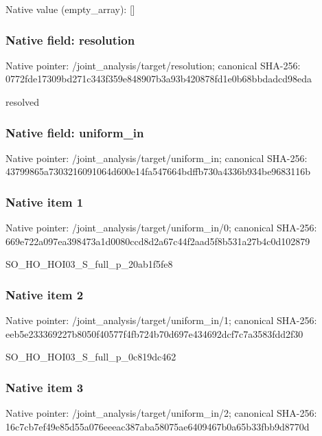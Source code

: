 \documentclass[10pt,a4paper]{article}
\begin{document}
Native value (empty\_\allowbreak{}array): []

\subsubsection{Native field: resolution}
Native pointer: /joint\_\allowbreak{}analysis/target/resolution; canonical SHA-256: 0772fde17309bd271c343f359e848907b3a93b420878fd1e0b68bbdadcd98eda

\begingroup\raggedright\sloppy resolved\par\endgroup

\subsubsection{Native field: uniform\_\allowbreak{}in}
Native pointer: /joint\_\allowbreak{}analysis/target/uniform\_\allowbreak{}in; canonical SHA-256: 43799865a7303216091064d600e14fa547664bdffb730a4336b934be9683116b

\subsubsection{Native item 1}
Native pointer: /joint\_\allowbreak{}analysis/target/uniform\_\allowbreak{}in/0; canonical SHA-256: 669e722a097ea398473a1d0080ccd8d2a67c44f2aad5f8b531a27b4c0d102879

\begingroup\raggedright\sloppy SO\_\allowbreak{}HO\_\allowbreak{}HOI03\_\allowbreak{}S\_\allowbreak{}full\_\allowbreak{}p\_\allowbreak{}20ab1f5fe8\par\endgroup

\subsubsection{Native item 2}
Native pointer: /joint\_\allowbreak{}analysis/target/uniform\_\allowbreak{}in/1; canonical SHA-256: eeb5e233369227b8050f40577f4fb724b70d697e434692dcf7c7a3583fdd2f30

\begingroup\raggedright\sloppy SO\_\allowbreak{}HO\_\allowbreak{}HOI03\_\allowbreak{}S\_\allowbreak{}full\_\allowbreak{}p\_\allowbreak{}0c819dc462\par\endgroup

\subsubsection{Native item 3}
Native pointer: /joint\_\allowbreak{}analysis/target/uniform\_\allowbreak{}in/2; canonical SHA-256: 16c7cb7ef49e85d55a076eeeac387aba58075ae6409467b0a65b33fbb9d8770d
\end{document}

